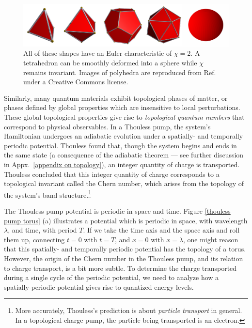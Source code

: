 \documentclass{beavtex_dub_edit}
\begin{document}
\begin{figure}
    \includegraphics[width = 1\textwidth]{shapes intro fig.pdf}
    \caption[Shapes which have an Euler characteristic of $\chi = 2$.]{All of these shapes have an Euler characteristic of $\chi = 2$. A tetrahedron can be smoothly deformed into a sphere while $\chi$ remains invariant. Images of polyhedra are reproduced from Ref.\ \cite{webb_stella_nodate} under a Creative Commons license.}
    \label{surfaces}
\end{figure}

Similarly, many quantum materials exhibit topological phases of matter, or phases defined by global properties which are insensitive to local perturbations. These global topological properties give rise to \textit{topological quantum numbers} that correspond to physical observables. In a Thouless pump, the system's Hamiltonian undergoes an adiabatic evolution under a spatially- and temporally periodic potential. Thouless found that, though the system begins and ends in the same state (a consequence of the adiabatic theorem — see further discussion in Appx.\ \ref{appendix on topology}), an integer quantity of charge is transported. Thouless concluded that this integer quantity of charge corresponds to a topological invariant called the Chern number, which arises from the topology of the system's band structure.\footnote{More accurately, Thouless's prediction is about \textit{particle transport} in general. In a topological charge pump, the particle being transported is an electron.}

The Thouless pump potential is periodic in space and time. Figure \ref{thouless pump torus} (a) illustrates a potential which is periodic in space, with wavelength $\lambda$, and time, with period $T$. If we take the time axis and the space axis and roll them up, connecting $t = 0$ with $t = T$, and $x = 0$ with $x = \lambda$, one might reason that this spatially- and temporally periodic potential has the topology of a torus. However, the origin of the Chern number in the Thouless pump, and its relation to charge transport, is a bit more subtle. To determine the charge transported during a single cycle of the periodic potential, we need to analyze how a spatially-periodic potential gives rise to quantized energy levels.
\end{document}
